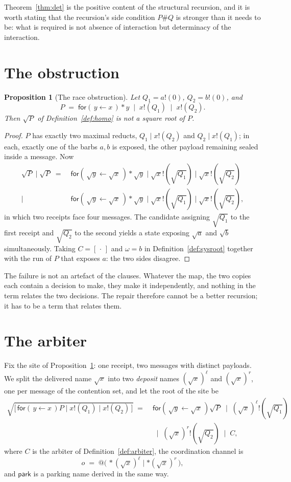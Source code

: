 \documentclass[11pt]{article}
\newtheorem{proposition}[theorem]{Proposition}
\theoremstyle{definition}
\newcommand{\In}[2]{\mathsf{for}(\,#1 \leftarrow #2\,)}
\newcommand{\rt}[1]{\sqrt{#1}}
\begin{document}
Theorem~\ref{thm:det} is the positive content of the structural recursion, and it is worth stating that the recursion's side condition $P \# Q$ is stronger than it needs to be: what is required is not absence of interaction but determinacy of the interaction.

\section{The obstruction}\label{sec:race}

\begin{proposition}[The race obstruction]\label{prop:race}
Let $Q_1 = a!(0)$, $Q_2 = b!(0)$, and
\[
  P \;=\; \In{y}{x}{*}y \;\mid\; x!(Q_1) \;\mid\; x!(Q_2) .
\]
Then $\rt{P}$ of Definition~\ref{def:homo} is not a square root of $P$.
\end{proposition}

\begin{proof}
$P$ has exactly two maximal reducts, $Q_1 \mid x!(Q_2)$ and $Q_2 \mid x!(Q_1)$; in each, exactly one of the barbs $a, b$ is exposed, the other payload remaining sealed inside a message. Now
\begin{align*}
  \rt{P} \mid \rt{P}
  \;=\;&
  \In{\rt{y}}{\rt{x}}{*}\rt{y} \mid \rt{x}!(\rt{Q_1}) \mid \rt{x}!(\rt{Q_2}) \\
  \mid\;&
  \In{\rt{y}}{\rt{x}}{*}\rt{y} \mid \rt{x}!(\rt{Q_1}) \mid \rt{x}!(\rt{Q_2}) ,
\end{align*}
in which two receipts face four messages. The candidate assigning $\rt{Q_1}$ to the first receipt and $\rt{Q_2}$ to the second yields a state exposing $\rt{a}$ and $\rt{b}$ simultaneously. Taking $C = [\,\cdot\,]$ and $\omega = b$ in Definition~\ref{def:sysroot} together with the run of $P$ that exposes $a$: the two sides disagree.
\end{proof}

The failure is not an artefact of the clauses. Whatever the map, the two copies each contain a decision to make, they make it independently, and nothing in the term relates the two decisions. The repair therefore cannot be a better recursion; it has to be a term that relates them.

\section{The arbiter}\label{sec:arb}

Fix the site of Proposition~\ref{prop:race}: one receipt, two messages with distinct payloads. We split the delivered name $\rt{x}$ into two \emph{deposit} names $(\rt{x})^{\ell}$ and $(\rt{x})^{r}$, one per message of the contention set, and let the root of the site be
\begin{align*}
  \rt{\Big[\,\In{y}{x}P \mid x!(Q_1) \mid x!(Q_2)\,\Big]}
  \;=\;&
  \In{\rt{y}}{\rt{x}}\rt{P}
  \;\mid\; (\rt{x})^{\ell}!(\rt{Q_1}) \\
  &\;\mid\; (\rt{x})^{r}!(\rt{Q_2})
  \;\mid\; C ,
\end{align*}
where $C$ is the arbiter of Definition~\ref{def:arbiter}, the coordination channel is
\[
  o \;=\; @\big(\,{*}(\rt{x})^{\ell} \mid {*}(\rt{x})^{r}\,\big) ,
\]
and $\mathsf{park}$ is a parking name derived in the same way.
\end{document}
